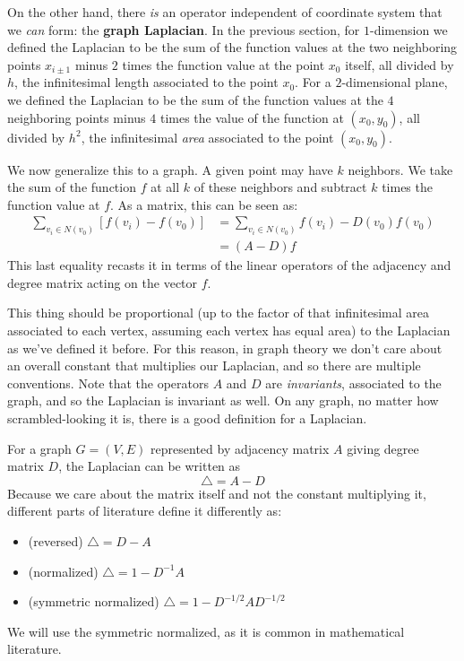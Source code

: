 \documentclass[../master.tex]{subfiles}
\begin{document}
	On the other hand, there \emph{is} an operator independent of coordinate system that we \emph{can} form: the \textbf{graph Laplacian}. In the previous section, for $1$-dimension we defined the Laplacian to be the sum of the function values at the two neighboring points $x_{i\pm 1}$ minus $2$ times the function value at the point $x_0$ itself, all divided by $h$, the infinitesimal length associated to the point $x_0$. For a $2$-dimensional plane, we defined the Laplacian to be the sum of the function values at the $4$ neighboring points minus $4$ times the value of the function at $(x_0, y_0)$, all divided by $h^2$, the infinitesimal \emph{area} associated to the point $(x_0, y_0)$.
	
	We now generalize this to a graph. A given point may have $k$ neighbors. We take the sum of the function $f$ at all $k$ of these neighbors and subtract $k$ times the function value at $f$. As a matrix, this can be seen as:
	\begin{align}
		\sum_{v_i \in N(v_0)} [f(v_{i}) -  f(v_0)] &= \sum_{v_i \in N(v_0)} f(v_{i}) - D(v_0) f(v_0)\\ &= (A-D) f
	\end{align} 
	This last equality recasts it in terms of the linear operators of the adjacency and degree matrix acting on the vector $f$. 
	
	This thing should be proportional (up to the factor of that infinitesimal area associated to each vertex, assuming each vertex has equal area) to the Laplacian as we've defined it before. For this reason, in graph theory we don't care about an overall constant that multiplies our Laplacian, and so there are multiple conventions. Note that the operators $A$ and $D$ are \emph{invariants}, associated to the graph, and so the Laplacian is invariant as well. On any graph, no matter how scrambled-looking it is, there is a good definition for a Laplacian. 
	\begin{defn}
		For a graph $G = (V,E)$ represented by adjacency matrix $A$ giving degree matrix $D$, the Laplacian can be written as 
		\begin{equation}
			\triangle = A - D
		\end{equation}
		Because we care about the matrix itself and not the constant multiplying it, different parts of literature define it differently as:
		\begin{itemize}
			\item (reversed) $\triangle = D-A$
			\item (normalized) $\triangle = 1 - D^{-1} A$
			\item (symmetric normalized) $\triangle = 1 - D^{-1/2} A D^{-1/2}$ 
		\end{itemize}
	\end{defn}
	We will use the symmetric normalized, as it is common in mathematical literature. 
	
\end{document}
